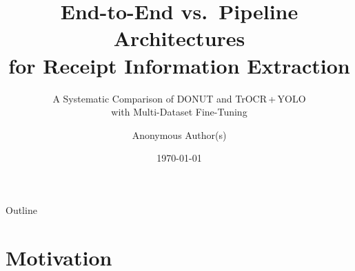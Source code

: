 \documentclass[aspectratio=169,11pt]{beamer}
\title[Receipt KIE: DONUT vs TrOCR+YOLO]{%
  End-to-End vs.\ Pipeline Architectures\\[3pt]
  for Receipt Information Extraction}
\subtitle{A Systematic Comparison of DONUT and TrOCR\,+\,YOLO\\
          with Multi-Dataset Fine-Tuning}
\author[Author(s)]{Anonymous Author(s)}
\institute[Institution]{Institution}
\date{\today}
\begin{document}

{
\begin{frame}[noframenumbering]
  \titlepage
\end{frame}
}

\begin{frame}{Outline}
  \tableofcontents
\end{frame}

\section{Motivation}
\end{document}
